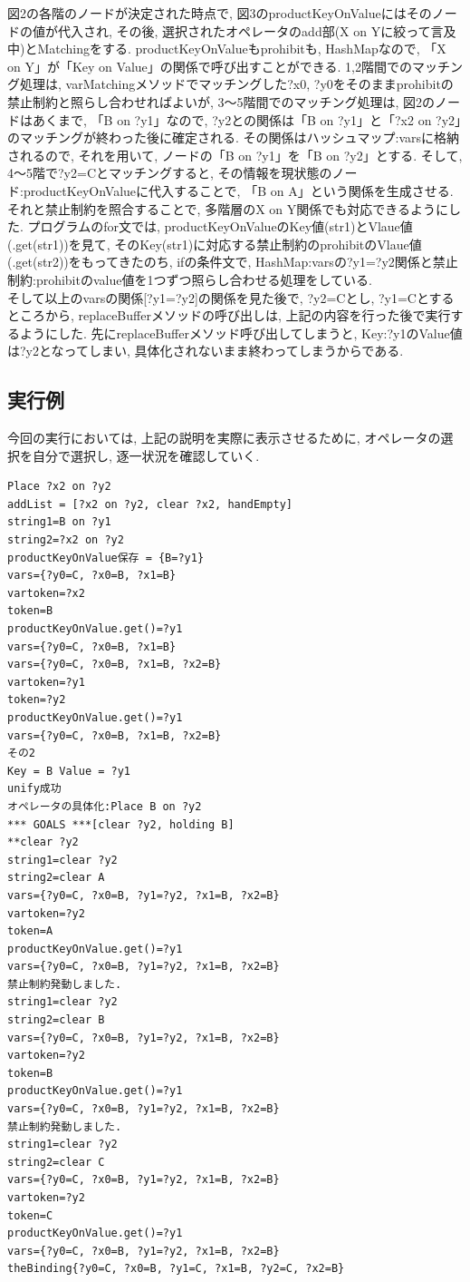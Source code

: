 \documentclass[uplatex,12pt]{jsarticle}
\begin{document}
図2の各階のノードが決定された時点で, 図3のproductKeyOnValueにはそのノードの値が代入され, その後, 選択されたオペレータのadd部(X on Yに絞って言及中)とMatchingをする. productKeyOnValueもprohibitも, HashMapなので, 「X on Y」が「Key on Value」の関係で呼び出すことができる. 1,2階間でのマッチング処理は, varMatchingメソッドでマッチングした?x0, ?y0をそのままprohibitの禁止制約と照らし合わせればよいが, 3～5階間でのマッチング処理は, 図2のノードはあくまで, 「B on ?y1」なので, ?y2との関係は「B on ?y1」と「?x2 on ?y2」のマッチングが終わった後に確定される. その関係はハッシュマップ:varsに格納されるので, それを用いて, ノードの「B on ?y1」を「B on ?y2」とする. そして, 4～5階で?y2=Cとマッチングすると, その情報を現状態のノード:productKeyOnValueに代入することで, 「B on A」という関係を生成させる. それと禁止制約を照合することで, 多階層のX on Y関係でも対応できるようにした. プログラムのfor文では, productKeyOnValueのKey値(str1)とVlaue値(.get(str1))を見て, そのKey(str1)に対応する禁止制約のprohibitのVlaue値(.get(str2))をもってきたのち, ifの条件文で, HashMap:varsの{?y1=?y2}関係と禁止制約:prohibitのvalue値を1つずつ照らし合わせる処理をしている.\\

そして以上のvarsの関係[?y1=?y2]の関係を見た後で, ?y2=Cとし, ?y1=Cとするところから, replaceBufferメソッドの呼び出しは, 上記の内容を行った後で実行するようにした. 先にreplaceBufferメソッド呼び出してしまうと, Key:?y1のValue値は?y2となってしまい, 具体化されないまま終わってしまうからである.


\subsection{実行例}
今回の実行においては, 上記の説明を実際に表示させるために, オペレータの選択を自分で選択し, 逐一状況を確認していく.
\begin{lstlisting}[caption=3～5階層のマッチング, label=src:No1]
Place ?x2 on ?y2
addList = [?x2 on ?y2, clear ?x2, handEmpty]
string1=B on ?y1
string2=?x2 on ?y2
productKeyOnValue保存 = {B=?y1}
vars={?y0=C, ?x0=B, ?x1=B}
vartoken=?x2
token=B
productKeyOnValue.get()=?y1
vars={?y0=C, ?x0=B, ?x1=B}
vars={?y0=C, ?x0=B, ?x1=B, ?x2=B}
vartoken=?y1
token=?y2
productKeyOnValue.get()=?y1
vars={?y0=C, ?x0=B, ?x1=B, ?x2=B}
その2
Key = B Value = ?y1
unify成功
オペレータの具体化:Place B on ?y2
*** GOALS ***[clear ?y2, holding B]
**clear ?y2
string1=clear ?y2
string2=clear A
vars={?y0=C, ?x0=B, ?y1=?y2, ?x1=B, ?x2=B}
vartoken=?y2
token=A
productKeyOnValue.get()=?y1
vars={?y0=C, ?x0=B, ?y1=?y2, ?x1=B, ?x2=B}
禁止制約発動しました.
string1=clear ?y2
string2=clear B
vars={?y0=C, ?x0=B, ?y1=?y2, ?x1=B, ?x2=B}
vartoken=?y2
token=B
productKeyOnValue.get()=?y1
vars={?y0=C, ?x0=B, ?y1=?y2, ?x1=B, ?x2=B}
禁止制約発動しました.
string1=clear ?y2
string2=clear C
vars={?y0=C, ?x0=B, ?y1=?y2, ?x1=B, ?x2=B}
vartoken=?y2
token=C
productKeyOnValue.get()=?y1
vars={?y0=C, ?x0=B, ?y1=?y2, ?x1=B, ?x2=B}
theBinding{?y0=C, ?x0=B, ?y1=C, ?x1=B, ?y2=C, ?x2=B}
\end{lstlisting}
\end{document}
